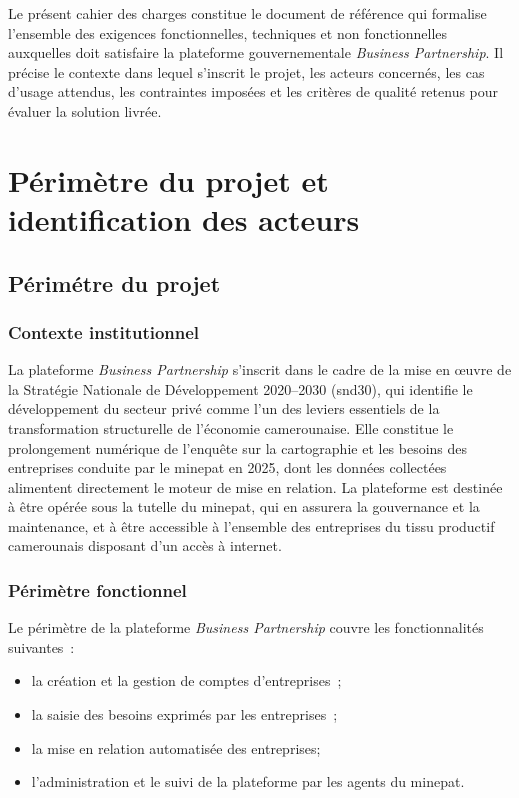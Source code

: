 \documentclass[12pt, a4paper, oneside]{report}
\begin{document}
	Le présent cahier des charges constitue le document de référence
	qui formalise l'ensemble des exigences fonctionnelles, techniques
	et non fonctionnelles auxquelles doit satisfaire la plateforme
	gouvernementale \textit{Business Partnership}. Il précise le
	contexte dans lequel s'inscrit le projet, les acteurs concernés,
	les cas d'usage attendus, les contraintes imposées et les critères
	de qualité retenus pour évaluer la solution livrée.
	
	\section{Périmètre du projet et identification des acteurs}
	\label{sec:contexte_projet}
	\subsection{Périmétre du projet}
	\subsubsection{Contexte institutionnel}
	
	La plateforme \textit{Business Partnership} s'inscrit dans le cadre
	de la mise en \oe uvre de la Stratégie Nationale de Développement
	2020--2030 (\gls{snd30}), qui identifie le développement du secteur
	privé comme l'un des leviers essentiels de la transformation
	structurelle de l'économie camerounaise. Elle constitue le
	prolongement numérique de l'enquête sur la cartographie et les
	besoins des entreprises conduite par le \gls{minepat} en 2025,
	dont les données collectées alimentent directement le moteur de mise en relation. La plateforme est
	destinée à être opérée sous la tutelle du \gls{minepat}, qui
	en assurera la gouvernance et la maintenance, et à être accessible
	à l'ensemble des entreprises du tissu productif camerounais
	disposant d'un accès à internet.
	
	\subsubsection{Périmètre fonctionnel}
	
	Le périmètre de la plateforme \textit{Business Partnership} couvre
	les fonctionnalités suivantes~:
	
	\begin{itemize}
		\item la création et la gestion de comptes d'entreprises~;
		\item la saisie des besoins exprimés par
		les entreprises~;
		\item la mise en relation automatisée des entreprises;
		\item l'administration et le suivi de la plateforme par les
		agents du \gls{minepat}.
	\end{itemize}
	
\end{document}
